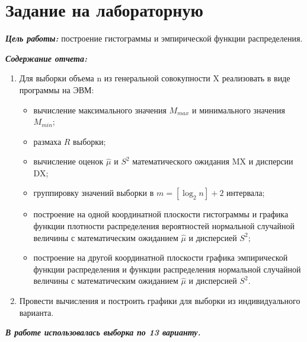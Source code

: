 \chapter{Задание на лабораторную}

\textbf{\textit{Цель работы:}} построение гистограммы и эмпирической функции распределения. 

\textbf{\textit{Содержание отчета:}}
\begin{enumerate}
	\item Для выборки объема n из генеральной совокупности X реализовать в виде программы на ЭВМ:
	\begin{itemize}
		\item вычисление максимального значения $M_{max}$ и минимального значения $M_{min}$;
		\item размаха $R$ выборки;
		\item вычисление оценок $\hat \mu$ и $S^2$ математического ожидания MX и дисперсии DX;
		\item группировку значений выборки в $m = [\log_2 n] + 2$ интервала;
		\item построение на одной координатной плоскости гистограммы и графика функции плотности распределения вероятностей нормальной случайной величины с математическим ожиданием $\hat \mu$ и дисперсией $S^2$;
		\item построение на другой координатной плоскости графика эмпирической функции распределения и функции распределения нормальной случайной величины с математическим ожиданием $\hat \mu$ и дисперсией $S^2$.
	\end{itemize}
	\item Провести вычисления и построить графики для выборки из индивидуального варианта.
\end{enumerate}

\textbf{\textit{В работе использовалась выборка по 13 варианту.}}